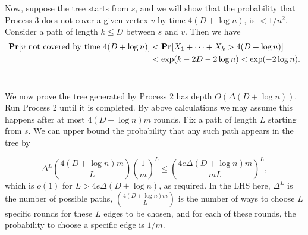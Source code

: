 \documentclass{article}
\begin{document}
Now, suppose the tree starts from $s$,
and we will show that the probability that Process 3 does not cover a given vertex $v$ by time $4 (D + \log n)$, is $< 1/n^2$.
Consider a path of length $k \leq D$ between $s$ and $v$. Then we have
\begin{align*}
\mathbf{Pr}[v \textnormal{ not covered by time }4 (D + \log n)] &< 
\mathbf{Pr}[X_1+\dots+X_k > 4(D + \log n)] \\
&<\exp(k - 2D - 2 \log n) < \exp(-2 \log n).
\end{align*}
\\ 

We now prove the tree generated by Process 2
has depth $O(\Delta (D + \log n))$.
Run Process 2 until it is completed.
By above calculations we may assume this happens after at most $4 (D + \log n) m$ rounds.
Fix a path of length $L$ starting from $s$. We can upper bound the probability that any such path appears in the tree by

$$
\Delta^L
\binom{4 (D + \log n) m}{L} \left( \frac{1}{m} \right)^L
\leq \left( \frac{ 4e \Delta(D + \log n)  m}{mL} \right)^L,
$$
which is $o(1)$ for $L>4e \Delta(D + \log n)$, as required.
In the LHS here,
$\Delta^L$ is the number of possible paths,
$\binom{4 (D + \log n) m}{L}$
is the number of ways to choose $L$ specific rounds for these $L$ edges to be chosen,
and for each of these rounds, the probability to choose a specific edge is $1/m$.
\\ 
\end{document}
